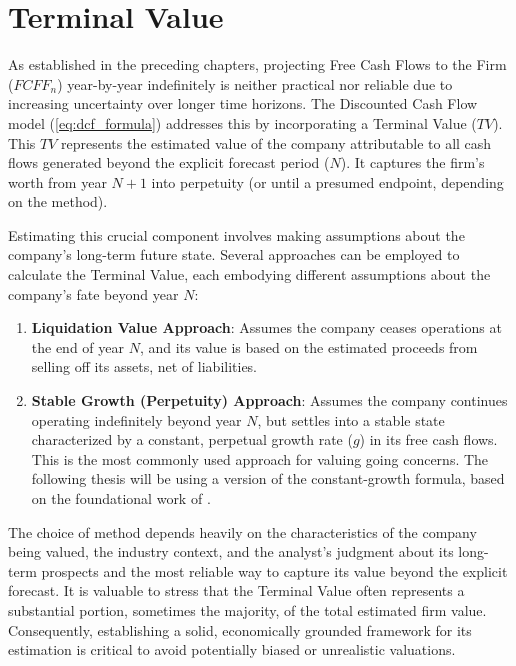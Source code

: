 \chapter{Terminal Value} \label{chap:terminal_value}

As established in the preceding chapters, projecting Free Cash Flows to the Firm (\(FCFF_n\)) year-by-year indefinitely is neither practical nor reliable due to increasing uncertainty over longer time horizons. The Discounted Cash Flow model (\ref{eq:dcf_formula}) addresses this by incorporating a Terminal Value (\(TV\)). This \(TV\) represents the estimated value of the company attributable to all cash flows generated beyond the explicit forecast period (\(N\)). It captures the firm's worth from year \(N+1\) into perpetuity (or until a presumed endpoint, depending on the method).

Estimating this crucial component involves making assumptions about the company's long-term future state. Several approaches can be employed to calculate the Terminal Value, each embodying different assumptions about the company's fate beyond year \(N\):

\begin{enumerate}
    \item \textbf{Liquidation Value Approach}: Assumes the company ceases operations at the end of year \(N\), and its value is based on the estimated proceeds from selling off its assets, net of liabilities.
    \item \textbf{Stable Growth (Perpetuity) Approach}: Assumes the company continues operating indefinitely beyond year \(N\), but settles into a stable state characterized by a constant, perpetual growth rate (\(g\)) in its free cash flows. This is the most commonly used approach for valuing going concerns. The following thesis will be using a version of the constant-growth formula, based on the foundational work of \textcite{gordon1956capital}.
\end{enumerate}

The choice of method depends heavily on the characteristics of the company being valued, the industry context, and the analyst's judgment about its long-term prospects and the most reliable way to capture its value beyond the explicit forecast. It is valuable to stress that the Terminal Value often represents a substantial portion, sometimes the majority, of the total estimated firm value. Consequently, establishing a solid, economically grounded framework for its estimation is critical to avoid potentially biased or unrealistic valuations.

